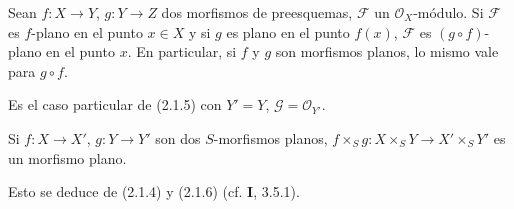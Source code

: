 \begin{corollary}[2.1.6]
\label{IV.2.1.6-fr}
Sean $f:X\to Y$, $g:Y\to Z$ dos morfismos de preesquemas, $\mathscr F$ un
$\mathcal O_X$-módulo. Si $\mathscr F$ es $f$-plano en el punto $x\in X$ y si
$g$ es plano en el punto $f(x)$, $\mathscr F$ es $(g\circ f)$-plano en el punto $x$. En
particular, si $f$ y $g$ son morfismos planos, lo mismo vale para
$g\circ f$.
\end{corollary}

Es el caso particular de (2.1.5) con $Y'=Y$, $\mathscr G=\mathcal O_{Y'}$.

\begin{corollary}[2.1.7]
\label{IV.2.1.7-fr}
Si $f:X\to X'$, $g:Y\to Y'$ son dos $S$-morfismos planos,
$f\times_S g:X\times_S Y\to X'\times_S Y'$ es un morfismo plano.
\end{corollary}

Esto se deduce de (2.1.4) y (2.1.6) (cf. \textbf I, 3.5.1).
